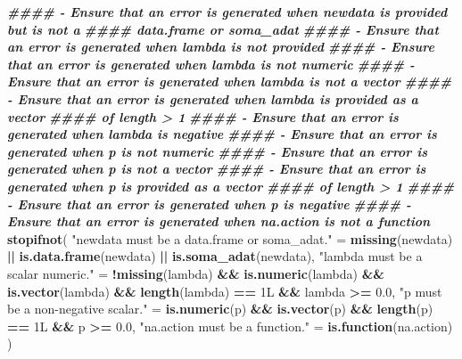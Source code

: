 \documentclass[
]{book}
\newenvironment{Shaded}{\begin{snugshade}}{\end{snugshade}}
\newcommand{\DocumentationTok}[1]{\textcolor[rgb]{0.56,0.35,0.01}{\textbf{\textit{#1}}}}
\newcommand{\FloatTok}[1]{\textcolor[rgb]{0.00,0.00,0.81}{#1}}
\newcommand{\FunctionTok}[1]{\textcolor[rgb]{0.13,0.29,0.53}{\textbf{#1}}}
\newcommand{\NormalTok}[1]{#1}
\newcommand{\OtherTok}[1]{\textcolor[rgb]{0.56,0.35,0.01}{#1}}
\newcommand{\SpecialCharTok}[1]{\textcolor[rgb]{0.81,0.36,0.00}{\textbf{#1}}}
\newcommand{\StringTok}[1]{\textcolor[rgb]{0.31,0.60,0.02}{#1}}
\begin{document}
\begin{Shaded}
\begin{Highlighting}[]
  \DocumentationTok{\#\#\#\# {-} Ensure that an error is generated when \textasciigrave{}newdata\textasciigrave{} is provided but is not a }
  \DocumentationTok{\#\#\#\#   data.frame or soma\_adat}
  \DocumentationTok{\#\#\#\# {-} Ensure that an error is generated when \textasciigrave{}lambda\textasciigrave{} is not provided}
  \DocumentationTok{\#\#\#\# {-} Ensure that an error is generated when \textasciigrave{}lambda\textasciigrave{} is not numeric}
  \DocumentationTok{\#\#\#\# {-} Ensure that an error is generated when \textasciigrave{}lambda\textasciigrave{} is not a vector}
  \DocumentationTok{\#\#\#\# {-} Ensure that an error is generated when \textasciigrave{}lambda\textasciigrave{} is provided as a vector}
  \DocumentationTok{\#\#\#\#   of length \textgreater{} 1}
  \DocumentationTok{\#\#\#\# {-} Ensure that an error is generated when \textasciigrave{}lambda\textasciigrave{} is negative}
  \DocumentationTok{\#\#\#\# {-} Ensure that an error is generated when \textasciigrave{}p\textasciigrave{} is not numeric}
  \DocumentationTok{\#\#\#\# {-} Ensure that an error is generated when \textasciigrave{}p\textasciigrave{} is not a vector}
  \DocumentationTok{\#\#\#\# {-} Ensure that an error is generated when \textasciigrave{}p\textasciigrave{} is provided as a vector}
  \DocumentationTok{\#\#\#\#   of length \textgreater{} 1}
  \DocumentationTok{\#\#\#\# {-} Ensure that an error is generated when \textasciigrave{}p\textasciigrave{} is negative}
  \DocumentationTok{\#\#\#\# {-} Ensure that an error is generated when \textasciigrave{}na.action\textasciigrave{} is not a function}
  \FunctionTok{stopifnot}\NormalTok{(}
    \StringTok{"\textasciigrave{}newdata\textasciigrave{} must be a data.frame or soma\_adat."} \OtherTok{=}
      \FunctionTok{missing}\NormalTok{(newdata) }\SpecialCharTok{||} \FunctionTok{is.data.frame}\NormalTok{(newdata) }\SpecialCharTok{||} \FunctionTok{is.soma\_adat}\NormalTok{(newdata),}
    \StringTok{"\textasciigrave{}lambda\textasciigrave{} must be a scalar numeric."} \OtherTok{=}
      \SpecialCharTok{!}\FunctionTok{missing}\NormalTok{(lambda) }\SpecialCharTok{\&\&} \FunctionTok{is.numeric}\NormalTok{(lambda) }\SpecialCharTok{\&\&} \FunctionTok{is.vector}\NormalTok{(lambda) }\SpecialCharTok{\&\&} 
      \FunctionTok{length}\NormalTok{(lambda) }\SpecialCharTok{==}\NormalTok{ 1L }\SpecialCharTok{\&\&}\NormalTok{ lambda }\SpecialCharTok{\textgreater{}=} \FloatTok{0.0}\NormalTok{,}
    \StringTok{"\textasciigrave{}p\textasciigrave{} must be a non{-}negative scalar."} \OtherTok{=} 
      \FunctionTok{is.numeric}\NormalTok{(p) }\SpecialCharTok{\&\&} \FunctionTok{is.vector}\NormalTok{(p) }\SpecialCharTok{\&\&} \FunctionTok{length}\NormalTok{(p) }\SpecialCharTok{==}\NormalTok{ 1L }\SpecialCharTok{\&\&}\NormalTok{ p }\SpecialCharTok{\textgreater{}=} \FloatTok{0.0}\NormalTok{,}
    \StringTok{"\textasciigrave{}na.action\textasciigrave{} must be a function."} \OtherTok{=} \FunctionTok{is.function}\NormalTok{(na.action)}
\NormalTok{  )}


\end{Highlighting}
\end{Shaded}
\end{document}
